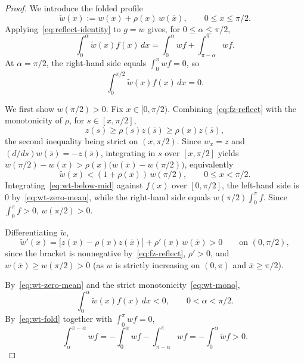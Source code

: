 \documentclass{amsart}
\begin{document}
\begin{proof}
We introduce the folded profile
\[
\tilde w(x):=w(x)+\rho(x)\,w(\bar x),\qquad 0\leq x\leq \pi/2.
\]
Applying~\eqref{eq:reflect-identity} to $g=w$ gives, for
$0\leq\alpha\leq\pi/2$,
\begin{equation}\label{eq:wt-fold}
\int_0^\alpha \tilde w(x)f(x)\,dx
=\int_0^\alpha wf+\int_{\pi-\alpha}^\pi wf .
\end{equation}
At $\alpha=\pi/2$, the right-hand side equals $\int_0^\pi wf=0$, so
\begin{equation}\label{eq:wt-zero-mean}
\int_0^{\pi/2} \tilde w(x)f(x)\,dx=0 .
\end{equation}

We first show $w(\pi/2)>0$. Fix $x\in[0,\pi/2)$.
Combining~\eqref{eq:fz-reflect} with the monotonicity of $\rho$, for
$s\in[x,\pi/2]$,
\[
z(s)\geq \rho(s)z(\bar s)\geq \rho(x)z(\bar s),
\]
the second inequality being strict on $(x,\pi/2)$. Since $w_x=z$ and
$(d/ds)w(\bar s)=-z(\bar s)$, integrating in $s$ over $[x,\pi/2]$
yields $w(\pi/2)-w(x)>\rho(x)\bigl(w(\bar x)-w(\pi/2)\bigr)$,
equivalently
\begin{equation}\label{eq:wt-below-mid}
\tilde w(x)<(1+\rho(x))\,w(\pi/2),\qquad 0\leq x<\pi/2.
\end{equation}
Integrating~\eqref{eq:wt-below-mid} against $f(x)$ over $[0,\pi/2]$,
the left-hand side is $0$ by~\eqref{eq:wt-zero-mean}, while the
right-hand side equals $w(\pi/2)\int_0^\pi f$. Since $\int_0^\pi f>0$,
$w(\pi/2)>0$.

Differentiating $\tilde w$,
\begin{equation}\label{eq:wt-mono}
\tilde w'(x)=\bigl[z(x)-\rho(x)z(\bar x)\bigr]+\rho'(x)\,w(\bar x)>0
\qquad\text{on }(0,\pi/2),
\end{equation}
since the bracket is nonnegative by~\eqref{eq:fz-reflect}, $\rho'>0$,
and $w(\bar x)\geq w(\pi/2)>0$ (as $w$ is strictly increasing on
$(0,\pi)$ and $\bar x\geq \pi/2$).

By~\eqref{eq:wt-zero-mean} and the strict
monotonicity~\eqref{eq:wt-mono},
\[
\int_0^\alpha \tilde w(x)f(x)\,dx<0,\qquad 0<\alpha<\pi/2.
\]
By~\eqref{eq:wt-fold} together with $\int_0^\pi wf=0$,
\[
\int_\alpha^{\pi-\alpha}wf
=-\int_0^\alpha wf-\int_{\pi-\alpha}^\pi wf
=-\int_0^\alpha \tilde w f>0.
\]
\end{proof}
\end{document}
